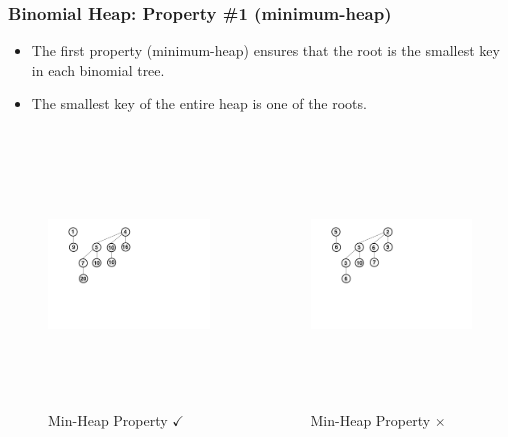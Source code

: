 \documentclass[13pt]{beamer}
\begin{document}
\begin{frame}
\frametitle{Binomial Heap: Property \#1 (minimum-heap)}
  \begin{itemize}
    \item The first property (minimum-heap) ensures that the root is the smallest key in each binomial tree.
    \item The smallest key of the entire heap is one of the roots.
  \end{itemize}

  \begin{columns}[T] %
    \begin{column}[T]{6.5cm} %
      \begin{figure}
        \caption{Min-Heap Property $\checkmark$}
        \includegraphics[height=7cm]{./img/minheap1.png}
      \end{figure}
      \centering
    \end{column}
    \begin{column}[T]{6.5cm} %
      \begin{figure}
        \caption{Min-Heap Property $\times$}
        \includegraphics[height=7cm]{./img/minheap2.png}
      \end{figure}
    \end{column}
  \end{columns}
\end{frame}
\end{document}
